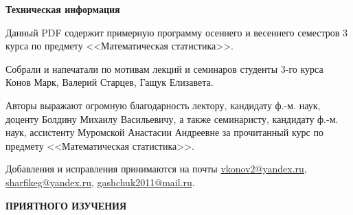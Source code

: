 \begin{center}
	{\Large \textbf{Техническая информация}}
\end{center}

\vspace{0.5cm}
Данный PDF содержит примерную программу осеннего и весеннего семестров 3 курса по предмету <<Математическая статистика>>.

\vspace{0.5cm}
Собрали и напечатали по мотивам лекций и семинаров студенты 3-го курса Конов Марк, Валерий Старцев, Гащук Елизавета.

\vspace{0.5cm}
Авторы выражают огромную благодарность лектору, кандидату ф.-м. наук, доценту Болдину Михаилу Васильевичу, а также семинаристу, кандидату ф.-м. наук, ассистенту Муромской Анастасии Андреевне за прочитанный курс по предмету <<Математическая статистика>>.

\vspace{0.5cm}
Добавления и исправления принимаются на почты \href{}{vkonov2@yandex.ru}, \\\href{}{sharfikeg@yandex.ru}, \href{}{gashchuk2011@mail.ru}.

\vspace{0.5cm}
\begin{center}
	{\Large \textbf{ПРИЯТНОГО ИЗУЧЕНИЯ}}
\end{center}

\newpage

